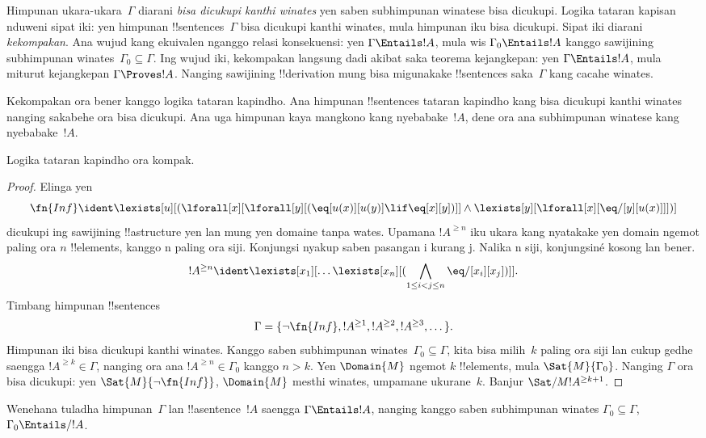 \documentclass[../../../include/open-logic-section]{subfiles}
\begin{document}


\begin{explain}
Himpunan ukara-ukara~$\Gamma$ diarani \emph{bisa dicukupi
kanthi winates} yen saben subhimpunan winatese bisa dicukupi.
Logika tataran kapisan nduweni sipat iki: yen himpunan
!!{sentence}s~$\Gamma$ bisa dicukupi kanthi winates, mula
himpunan iku bisa dicukupi. Sipat iki diarani \emph{kekompakan}.
Ana wujud kang ekuivalen nganggo relasi konsekuensi:
yen $\Gamma \Entails !A$, mula wis
$\Gamma_0 \Entails !A$ kanggo sawijining subhimpunan
winates~$\Gamma_0 \subseteq \Gamma$. Ing wujud iki, kekompakan
langsung dadi akibat saka teorema kejangkepan: yen
$\Gamma \Entails !A$, mula miturut kejangkepan
$\Gamma \Proves !A$. Nanging sawijining !!{derivation}
mung bisa migunakake !!{sentence}s saka~$\Gamma$
kang cacahe winates.

Kekompakan ora bener kanggo logika tataran kapindho. Ana
himpunan !!{sentence}s tataran kapindho kang bisa dicukupi
kanthi winates nanging sakabehe ora bisa dicukupi. Ana
uga himpunan kaya mangkono kang nyebabake~$!A$,
dene ora ana subhimpunan winatese kang nyebabake~$!A$.
\end{explain}


\begin{thm}
Logika tataran kapindho ora kompak.
\end{thm}

\begin{proof}
Elinga yen
\[
\fn{Inf} \ident \lexists[u][(\lforall[x][\lforall[y][(\eq[u(x)][u(y)]
      \lif \eq[x][y])]] \land \lexists[y][\lforall[x][\eq/[y][u(x)]]])]
\]
dicukupi ing sawijining !!a{structure} yen lan mung yen
domaine tanpa wates. Upamana $!A^{\ge n}$ iku
ukara kang nyatakake yen domain ngemot
paling ora $n$ !!{element}s, kanggo n paling ora siji. Konjungsi nyakup saben pasangan i kurang j. Nalika n siji, konjungsiné kosong lan bener.
\[
!A^{\ge n} \ident \lexists[x_1][\dots\lexists[x_n][(\bigwedge_{1 \le i < j \le n} \eq/[x_i][x_j])]].
\]
Timbang himpunan !!{sentence}s
\[
\Gamma = \{\lnot \fn{Inf}, !A^{\ge 1}, !A^{\ge 2}, !A^{\ge 3}, \dots\}.
\]
Himpunan iki bisa dicukupi kanthi winates. Kanggo saben
subhimpunan winates~$\Gamma_0 \subseteq \Gamma$,
kita bisa milih~$k$ paling ora siji lan cukup gedhe saengga $!A^{\ge k} \in \Gamma$,
nanging ora ana $!A^{\ge n}
\in \Gamma_0$ kanggo $n>k$. Yen $\Domain{M}$
ngemot $k$ !!{element}s, mula $\Sat{M}{\Gamma_0}$.
Nanging $\Gamma$ ora bisa dicukupi: yen
$\Sat{M}{\lnot \fn{Inf}}$, $\Domain{M}$ mesthi
winates, umpamane ukurane~$k$. Banjur
$\Sat/{M}{!A^{\ge k+1}}$.
\end{proof}

\begin{prob}
Wenehana tuladha himpunan~$\Gamma$ lan
!!a{sentence}~$!A$ saengga $\Gamma \Entails !A$,
nanging kanggo saben subhimpunan winates
$\Gamma_0 \subseteq \Gamma$,
$\Gamma_0 \Entails/ !A$.
\end{prob}
\end{document}
